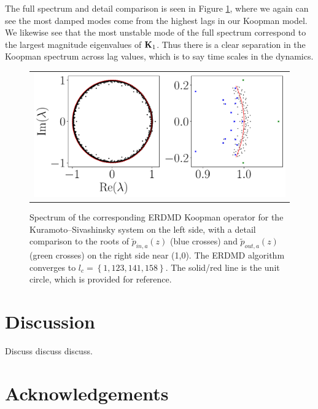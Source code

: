 \documentclass[a4paper,11pt]{article}
\begin{document}
The full spectrum and detail comparison is seen in Figure \ref{fig:ksspectrum}, where we again can see the most damped modes come from the highest lags in our Koopman model.  We likewise see that the most unstable mode of the full spectrum correspond to the largest magnitude eigenvalues of ${\bf K}_{1}$.  Thus there is a clear separation in the Koopman spectrum across lag values, which is to say time scales in the dynamics.     
\begin{figure}[!h]
\centering
\begin{tabular}{c}
\includegraphics[width=1\textwidth]{Kuramoto_detail_spectrum_w_mx_lag_158} \end{tabular}
\caption{Spectrum of the corresponding ERDMD Koopman operator for the Kuramoto--Sivashinsky system on the left side, with a detail comparison to the roots of $\tilde{p}_{in,a}(z)$ (blue crosses) and $\tilde{p}_{out,a}(z)$ (green crosses) on the right side near (1,0).  The ERDMD algorithm converges to $l_{c}=\left\{1, 123, 141, 158\right\}$.  The solid/red line is the unit circle, which is provided for reference.}
\label{fig:ksspectrum}
\end{figure}

\section{Discussion}


Discuss discuss discuss.
\section*{Acknowledgements}




\end{document}
